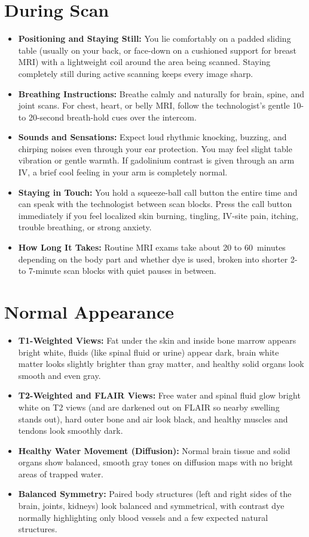 \section{During Scan}
\begin{itemize}
\item \textbf{Positioning and Staying Still:} You lie comfortably on a padded sliding table (usually on your back, or face-down on a cushioned support for breast MRI) with a lightweight coil around the area being scanned. Staying completely still during active scanning keeps every image sharp.
\item \textbf{Breathing Instructions:} Breathe calmly and naturally for brain, spine, and joint scans. For chest, heart, or belly MRI, follow the technologist's gentle 10- to 20-second breath-hold cues over the intercom.
\item \textbf{Sounds and Sensations:} Expect loud rhythmic knocking, buzzing, and chirping noises even through your ear protection. You may feel slight table vibration or gentle warmth. If gadolinium contrast is given through an arm IV, a brief cool feeling in your arm is completely normal.
\item \textbf{Staying in Touch:} You hold a squeeze-ball call button the entire time and can speak with the technologist between scan blocks. Press the call button immediately if you feel localized skin burning, tingling, IV-site pain, itching, trouble breathing, or strong anxiety.
\item \textbf{How Long It Takes:} Routine MRI exams take about 20 to 60~minutes depending on the body part and whether dye is used, broken into shorter 2- to 7-minute scan blocks with quiet pauses in between.
\end{itemize}

\section{Normal Appearance}
\begin{itemize}
\item \textbf{T1-Weighted Views:} Fat under the skin and inside bone marrow appears bright white, fluids (like spinal fluid or urine) appear dark, brain white matter looks slightly brighter than gray matter, and healthy solid organs look smooth and even gray.
\item \textbf{T2-Weighted and FLAIR Views:} Free water and spinal fluid glow bright white on T2 views (and are darkened out on FLAIR so nearby swelling stands out), hard outer bone and air look black, and healthy muscles and tendons look smoothly dark.
\item \textbf{Healthy Water Movement (Diffusion):} Normal brain tissue and solid organs show balanced, smooth gray tones on diffusion maps with no bright areas of trapped water.
\item \textbf{Balanced Symmetry:} Paired body structures (left and right sides of the brain, joints, kidneys) look balanced and symmetrical, with contrast dye normally highlighting only blood vessels and a few expected natural structures.
\end{itemize}

